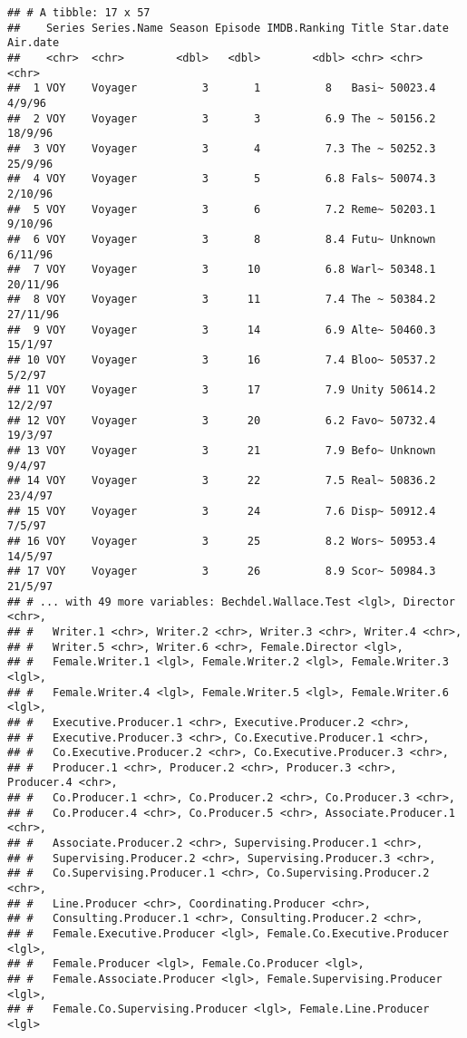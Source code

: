 \documentclass[
]{article}
\begin{document}
\begin{verbatim}
## # A tibble: 17 x 57
##    Series Series.Name Season Episode IMDB.Ranking Title Star.date Air.date
##    <chr>  <chr>        <dbl>   <dbl>        <dbl> <chr> <chr>     <chr>   
##  1 VOY    Voyager          3       1          8   Basi~ 50023.4   4/9/96  
##  2 VOY    Voyager          3       3          6.9 The ~ 50156.2   18/9/96 
##  3 VOY    Voyager          3       4          7.3 The ~ 50252.3   25/9/96 
##  4 VOY    Voyager          3       5          6.8 Fals~ 50074.3   2/10/96 
##  5 VOY    Voyager          3       6          7.2 Reme~ 50203.1   9/10/96 
##  6 VOY    Voyager          3       8          8.4 Futu~ Unknown   6/11/96 
##  7 VOY    Voyager          3      10          6.8 Warl~ 50348.1   20/11/96
##  8 VOY    Voyager          3      11          7.4 The ~ 50384.2   27/11/96
##  9 VOY    Voyager          3      14          6.9 Alte~ 50460.3   15/1/97 
## 10 VOY    Voyager          3      16          7.4 Bloo~ 50537.2   5/2/97  
## 11 VOY    Voyager          3      17          7.9 Unity 50614.2   12/2/97 
## 12 VOY    Voyager          3      20          6.2 Favo~ 50732.4   19/3/97 
## 13 VOY    Voyager          3      21          7.9 Befo~ Unknown   9/4/97  
## 14 VOY    Voyager          3      22          7.5 Real~ 50836.2   23/4/97 
## 15 VOY    Voyager          3      24          7.6 Disp~ 50912.4   7/5/97  
## 16 VOY    Voyager          3      25          8.2 Wors~ 50953.4   14/5/97 
## 17 VOY    Voyager          3      26          8.9 Scor~ 50984.3   21/5/97 
## # ... with 49 more variables: Bechdel.Wallace.Test <lgl>, Director <chr>,
## #   Writer.1 <chr>, Writer.2 <chr>, Writer.3 <chr>, Writer.4 <chr>,
## #   Writer.5 <chr>, Writer.6 <chr>, Female.Director <lgl>,
## #   Female.Writer.1 <lgl>, Female.Writer.2 <lgl>, Female.Writer.3 <lgl>,
## #   Female.Writer.4 <lgl>, Female.Writer.5 <lgl>, Female.Writer.6 <lgl>,
## #   Executive.Producer.1 <chr>, Executive.Producer.2 <chr>,
## #   Executive.Producer.3 <chr>, Co.Executive.Producer.1 <chr>,
## #   Co.Executive.Producer.2 <chr>, Co.Executive.Producer.3 <chr>,
## #   Producer.1 <chr>, Producer.2 <chr>, Producer.3 <chr>, Producer.4 <chr>,
## #   Co.Producer.1 <chr>, Co.Producer.2 <chr>, Co.Producer.3 <chr>,
## #   Co.Producer.4 <chr>, Co.Producer.5 <chr>, Associate.Producer.1 <chr>,
## #   Associate.Producer.2 <chr>, Supervising.Producer.1 <chr>,
## #   Supervising.Producer.2 <chr>, Supervising.Producer.3 <chr>,
## #   Co.Supervising.Producer.1 <chr>, Co.Supervising.Producer.2 <chr>,
## #   Line.Producer <chr>, Coordinating.Producer <chr>,
## #   Consulting.Producer.1 <chr>, Consulting.Producer.2 <chr>,
## #   Female.Executive.Producer <lgl>, Female.Co.Executive.Producer <lgl>,
## #   Female.Producer <lgl>, Female.Co.Producer <lgl>,
## #   Female.Associate.Producer <lgl>, Female.Supervising.Producer <lgl>,
## #   Female.Co.Supervising.Producer <lgl>, Female.Line.Producer <lgl>
\end{verbatim}
\end{document}
